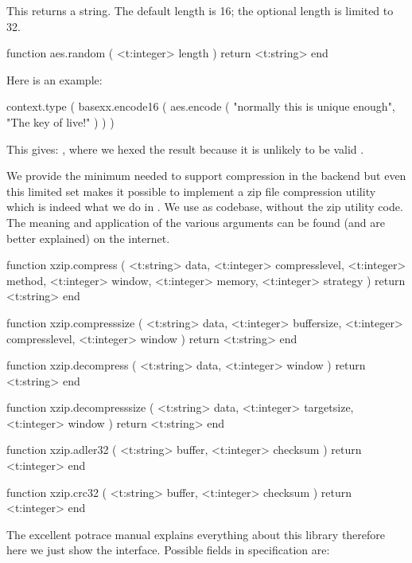 This returns a string. The default length is 16; the optional length is limited
to 32.

\starttyping[option=LUA]
function aes.random ( <t:integer> length )
    return <t:string>
end
\stoptyping

Here is an example:

\startbuffer
\startluacode
context.type ( basexx.encode16 ( aes.encode (
    "normally this is unique enough",
    "The key of live!"
) ) )
\stopluacode
\stopbuffer

\typebuffer

This gives: \inlinebuffer, where we hexed the result because
it is unlikely to be valid .

\stopsubsection

\startsubsection[title=ZIP (de)compression]

We provide the minimum needed to support compression in the backend but even this
limited set makes it possible to implement a zip file compression utility which
is indeed what we do in \CONTEXT. We use  as codebase, without the
zip utility code. The meaning and application of the various arguments can be
found (and are better explained) on the internet.

\starttyping[option=LUA]
function xzip.compress (
    <t:string>  data,
    <t:integer> compresslevel,
    <t:integer> method,
    <t:integer> window,
    <t:integer> memory,
    <t:integer> strategy
)
    return <t:string>
end

function xzip.compresssize (
    <t:string>  data,
    <t:integer> buffersize,
    <t:integer> compresslevel,
    <t:integer> window
)
    return <t:string>
end

function xzip.decompress (
    <t:string>  data,
    <t:integer> window
)
    return <t:string>
end

function xzip.decompresssize (
    <t:string>  data,
    <t:integer> targetsize,
    <t:integer> window
)
    return <t:string>
end

function xzip.adler32 (
    <t:string>  buffer,
    <t:integer> checksum
)
    return <t:integer>
end

function xzip.crc32 (
    <t:string>  buffer,
    <t:integer> checksum
)
    return <t:integer>
end
\stoptyping

\stopsubsection

\startsubsection[title=Potrace]

The excellent potrace manual explains everything about this library therefore
here we just show the interface. Possible fields in specification are:

